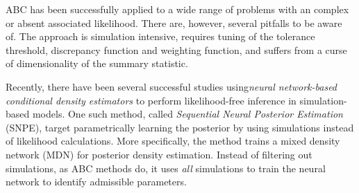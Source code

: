 ABC has been successfully applied to a wide range of problems with an complex or absent associated likelihood. There are, however, several pitfalls to be aware of. The approach is simulation intensive, requires tuning of the tolerance threshold, discrepancy function and weighting function, and suffers from a curse of dimensionality of the summary statistic.  

Recently, there have been several successful studies using\textit{neural network-based conditional density estimators} to perform likelihood-free inference in simulation-based models. One such method, called \textit{Sequential Neural Posterior Estimation} (SNPE), target parametrically learning the posterior by using simulations instead of likelihood calculations. More specifically, the method trains a mixed density network (MDN) for posterior density estimation. Instead of filtering out simulations, as ABC methods do, it uses \textit{all} simulations to train the neural network to identify admissible parameters. 

 







